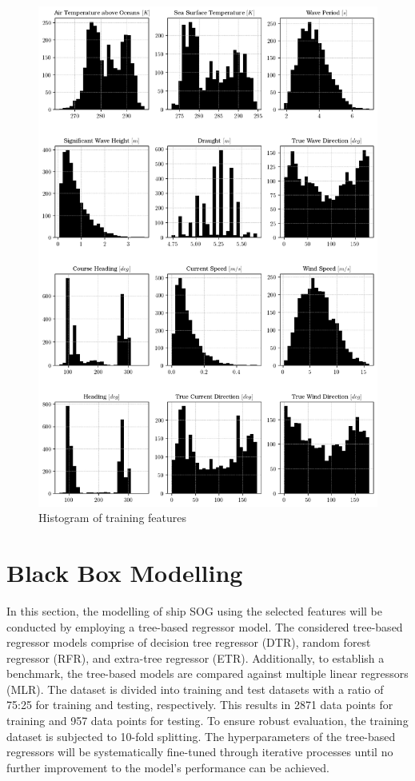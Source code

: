 \begin{figure}
    \centering
    \includegraphics[width=.9\linewidth]{02_figures/hist_init_preprocessing.png}
    \caption{Histogram of training features}
    \label{fig:hist_training_ftr_label}
\end{figure}

\section{Black Box Modelling}\label{sec:BBM_modelling}

In this section, the modelling of ship SOG using the selected features will be conducted by employing a tree-based regressor model. The considered tree-based regressor models comprise of decision tree regressor (DTR), random forest regressor (RFR), and extra-tree regressor (ETR). Additionally, to establish a benchmark, the tree-based models are compared against multiple linear regressors (MLR). The dataset is divided into training and test datasets with a ratio of 75:25 for training and testing, respectively. This results in 2871 data points for training and 957 data points for testing. To ensure robust evaluation, the training dataset is subjected to 10-fold splitting. The hyperparameters of the tree-based regressors will be systematically fine-tuned through iterative processes until no further improvement to the model's performance can be achieved.\\


